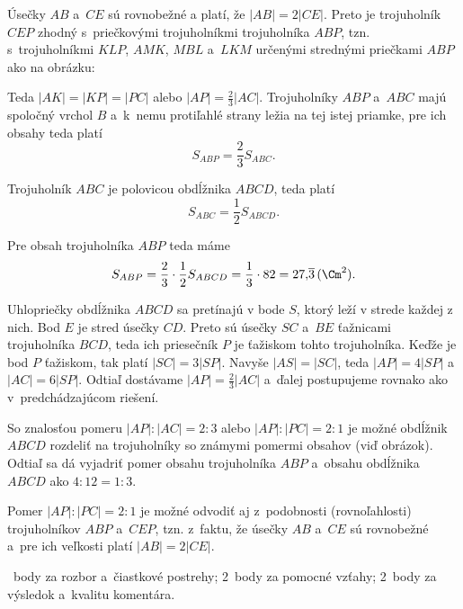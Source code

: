 {%
Úsečky $AB$ a~$CE$ sú rovnobežné a platí, že $|AB|=2|CE|$.
Preto je trojuholník $CEP$ zhodný s~priečkovými trojuholníkmi trojuholníka $ABP$, tzn. s~trojuholníkmi $KLP$, $AMK$, $MBL$ a~$LKM$ určenými strednými priečkami $ABP$ ako na obrázku:
%

Teda $|AK|=|KP|=|PC|$ alebo $|AP|=\frac23|AC|$.
Trojuholníky $ABP$ a~$ABC$ majú spoločný vrchol $B$ a~k~nemu protiľahlé strany ležia na tej istej priamke, pre ich obsahy teda platí
$$
S_{ABP} = \frac23 S_{ABC}.
$$

Trojuholník $ABC$ je polovicou obdĺžnika $ABCD$, teda platí
$$
S_{ABC}=\frac12S_{ABCD}.
$$

Pre obsah trojuholníka $ABP$ teda máme
$$
S_{ABP} = \frac23\cdot\frac12 S_{ABCD} = \frac13\cdot82 = 27{,}\overline{3}\,(\Cm^2).
$$

\ineriesenie
Uhlopriečky obdĺžnika $ABCD$ sa pretínajú v bode $S$, ktorý leží v strede každej z nich. Bod $E$ je stred úsečky $CD$.
Preto sú úsečky $SC$ a~$BE$ ťažnicami trojuholníka $BCD$, teda ich priesečník $P$ je ťažiskom tohto trojuholníka.
%
Keďže je bod $P$ ťažiskom, tak platí $|SC|=3|SP|$. Navyše $|AS|=|SC|$, teda $|AP|=4|SP|$ a~$|AC|=6|SP|$.
Odtiaľ dostávame $|AP|=\frac23|AC|$ a~ďalej postupujeme rovnako ako v~predchádzajúcom riešení.

\poznamky
So znalosťou pomeru $|AP|:|AC|=2:3$ alebo $|AP|:|PC|=2:1$ je možné obdĺžnik $ABCD$ rozdeliť na trojuholníky so známymi pomermi obsahov (viď obrázok). Odtiaľ sa dá vyjadriť pomer obsahu trojuholníka $ABP$ a~obsahu obdĺžnika $ABCD$ ako $4:12=1:3$.
%

Pomer $|AP|:|PC|=2:1$ je možné odvodiť aj z~podobnosti (rovnoľahlosti) trojuholníkov $ABP$ a~$CEP$, tzn. z~faktu, že úsečky $AB$ a~$CE$ sú rovnobežné a~pre ich veľkosti platí $|AB|=2|CE|$.

~body za rozbor a~čiastkové postrehy;
2~body za pomocné vzťahy;
2~body za výsledok a~kvalitu komentára.
\endhodnotenie
}


